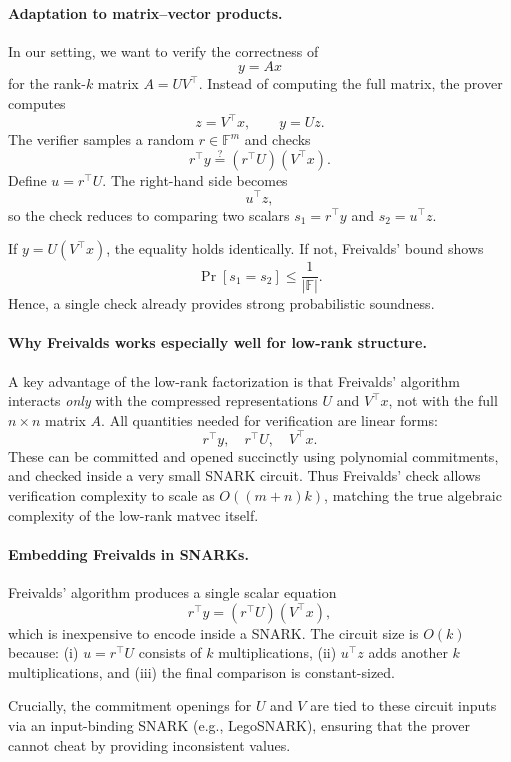\documentclass[11pt]{article}
\begin{document}
\paragraph{Adaptation to matrix–vector products.}
In our setting, we want to verify the correctness of 
\[
  y = A x
\]
for the rank-$k$ matrix $A = U V^\top$.
Instead of computing the full matrix, the prover computes
\[
  z = V^\top x, \qquad
  y = U z.
\]
The verifier samples a random $r \in \mathbb{F}^m$ and checks
\[
  r^\top y \stackrel{?}{=} (r^\top U)(V^\top x).
\]
Define $u = r^\top U$.
The right-hand side becomes
\[
  u^\top z,
\]
so the check reduces to comparing two scalars 
$s_1 = r^\top y$ and $s_2 = u^\top z$.

If $y = U(V^\top x)$, the equality holds identically.
If not, Freivalds' bound shows
\[
  \Pr[s_1 = s_2] \leq \frac{1}{|\mathbb{F}|}.
\]
Hence, a single check already provides strong probabilistic soundness.

\paragraph{Why Freivalds works especially well for low-rank structure.}
A key advantage of the low-rank factorization is that 
Freivalds' algorithm interacts \emph{only} with the compressed 
representations $U$ and $V^\top x$, not with the full $n \times n$ 
matrix $A$.
All quantities needed for verification are linear forms:
\[
  r^\top y,\quad r^\top U,\quad V^\top x.
\]
These can be committed and opened succinctly using polynomial 
commitments, and checked inside a very small SNARK circuit.
Thus Freivalds' check allows verification complexity to scale as 
$O((m+n)k)$, matching the true algebraic complexity of the low-rank 
matvec itself.

\paragraph{Embedding Freivalds in SNARKs.}
Freivalds' algorithm produces a single scalar equation
\[
  r^\top y = (r^\top U)(V^\top x),
\]
which is inexpensive to encode inside a SNARK.
The circuit size is $O(k)$ because:
(i) $u = r^\top U$ consists of $k$ multiplications,  
(ii) $u^\top z$ adds another $k$ multiplications, and  
(iii) the final comparison is constant-sized.

Crucially, the commitment openings for $U$ and $V$ are tied to these 
circuit inputs via an input-binding SNARK (e.g., LegoSNARK), ensuring 
that the prover cannot cheat by providing inconsistent values.
\end{document}
